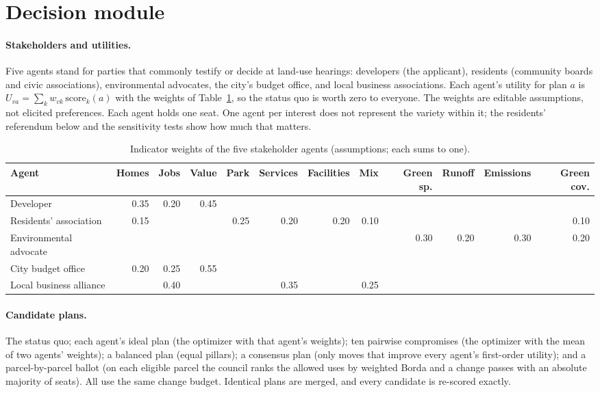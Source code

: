 \documentclass[10pt]{article}
\begin{document}
\section{Decision module}\label{s:decision}

\paragraph{Stakeholders and utilities.} Five agents stand for parties that commonly testify or decide at land-use
hearings: developers (the applicant), residents (community boards and civic associations), environmental advocates,
the city's budget office, and local business associations. Each agent's utility for plan $a$ is
$U_{va} = \sum_k w_{vk}\,\mathrm{score}_k(a)$ with the weights of Table~\ref{tab:s-weights}, so the status quo is worth
zero to everyone. The weights are editable assumptions, not elicited preferences. Each agent holds one seat. One
agent per interest does not represent the variety within it; the residents' referendum below and the sensitivity
tests show how much that matters.

\begin{table}[t]
\centering
\footnotesize
\setlength{\tabcolsep}{3pt}
\caption{Indicator weights of the five stakeholder agents (assumptions; each sums to one).}
\label{tab:s-weights}
\begin{tabular}{lrrrrrrrrrrr}
\toprule
Agent & Homes & Jobs & Value & Park & Services & Facilities & Mix & Green sp. & Runoff & Emissions & Green cov. \\
\midrule
Developer & 0.35 & 0.20 & 0.45 &  &  &  &  &  &  &  &  \\
Residents' association & 0.15 &  &  & 0.25 & 0.20 & 0.20 & 0.10 &  &  &  & 0.10 \\
Environmental advocate &  &  &  &  &  &  &  & 0.30 & 0.20 & 0.30 & 0.20 \\
City budget office & 0.20 & 0.25 & 0.55 &  &  &  &  &  &  &  &  \\
Local business alliance &  & 0.40 &  &  & 0.35 &  & 0.25 &  &  &  &  \\
\bottomrule
\end{tabular}
\end{table}

\paragraph{Candidate plans.} The status quo; each agent's ideal plan (the optimizer with that agent's weights); ten
pairwise compromises (the optimizer with the mean of two agents' weights); a balanced plan (equal pillars); a
consensus plan (only moves that improve every agent's first-order utility); and a parcel-by-parcel ballot (on each
eligible parcel the council ranks the allowed uses by weighted Borda and a change passes with an absolute majority of
seats). All use the same change budget. Identical plans are merged, and every candidate is re-scored exactly.
\end{document}
